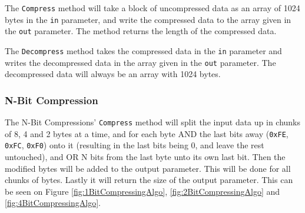 The \texttt{Compress} method will take a block of uncompressed data as an array of 1024 bytes in the \texttt{in} parameter, and write the compressed data to the array given in the \texttt{out} parameter. The method returns the length of the compressed data.

The \texttt{Decompress} method takes the compressed data in the \texttt{in} parameter and writes the decompressed data in the array given in the \texttt{out} parameter.
The decompressed data will always be an array with 1024 bytes.



\subsubsection{N-Bit Compression}

The N-Bit Compressions' \texttt{Compress} method will split the input data up in chunks of 8, 4 and 2 bytes at a time, and for each byte AND the last bits away (\texttt{0xFE}, \texttt{0xFC}, \texttt{0xF0}) onto it (resulting in the last bits being 0, and leave the rest untouched), and OR N bits from the last byte unto its own last bit.
Then the modified bytes will be added to the output parameter.
This will be done for all chunks of bytes.
Lastly it will return the size of the output parameter.
This can be seen on Figure \ref{fig:1BitCompressingAlgo}, \ref{fig:2BitCompressingAlgo} and \ref{fig:4BitCompressingAlgo}.


